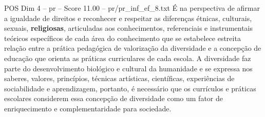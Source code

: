 \begin{textsample}{POS Dim 4 – pr – Score 11.00 – pr/pr\_inf\_ef\_8.txt}
É na perspectiva de afirmar a igualdade de direitos e reconhecer e respeitar as diferenças étnicas, culturais, sexuais, \textbf{religiosas}, articuladas aos conhecimentos, referenciais e instrumentais teóricos específicos de cada área do conhecimento que se estabelece estreita relação entre a prática pedagógica de valorização da diversidade e a concepção de educação que orienta as práticas curriculares de cada escola.
A diversidade faz parte do desenvolvimento biológico e cultural da humanidade e se expressa nos saberes, valores, princípios, técnicas artísticas, científicas, experiências de sociabilidade e aprendizagem, portanto, é necessário que os currículos e práticas escolares considerem essa concepção de diversidade como um fator de enriquecimento e complementaridade para sociedade.

\end{textsample}
